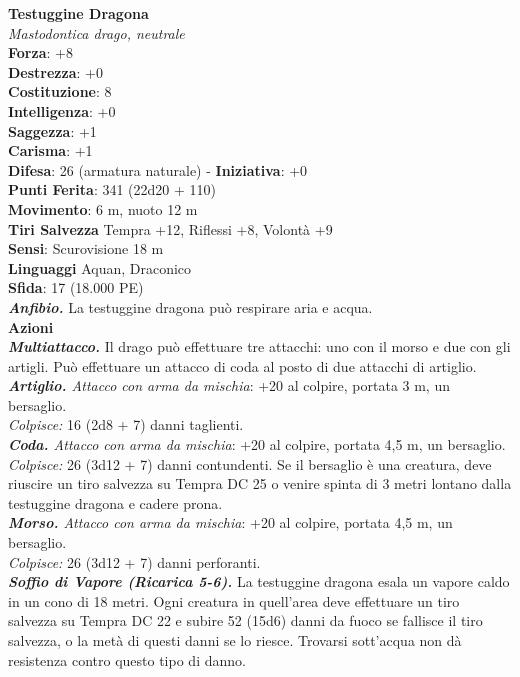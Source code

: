 \begin{multicols}{2}
\medskip\textbf{Testuggine Dragona}\\
\emph{Mastodontica drago, neutrale}\\
\textbf{Forza}: +8 \\
\textbf{Destrezza}: +0\\
\textbf{Costituzione}: 8\\
\textbf{Intelligenza}: +0\\
\textbf{Saggezza}: +1\\
\textbf{Carisma}: +1\\
\textbf{Difesa}: 26 (armatura naturale) - \textbf{Iniziativa}: +0\\
\textbf{Punti Ferita}: 341 (22d20 + 110)\\
\textbf{Movimento}: 6 m, nuoto 12 m\\
\textbf{Tiri Salvezza} Tempra +12, Riflessi +8, Volontà +9\\
\textbf{Sensi}: Scurovisione 18 m\\
\textbf{Linguaggi} Aquan, Draconico\\
\textbf{Sfida}: 17 (18.000 PE)\smallskip\\
\emph{\textbf{Anfibio.}} La testuggine dragona può respirare aria e acqua.\\
\smallskip\textbf{Azioni}\\
\emph{\textbf{Multiattacco.}} Il drago può effettuare tre attacchi: uno con il morso e due con gli artigli. Può effettuare un attacco di coda al posto di due attacchi di artiglio.\\
\emph{\textbf{Artiglio.} Attacco con arma da mischia}: +20 al colpire, portata 3 m, un bersaglio.\\
\emph{Colpisce:} 16 (2d8 + 7) danni taglienti. \\
\emph{\textbf{Coda.} Attacco con arma da mischia}: +20 al colpire, portata 4,5 m, un bersaglio.\\
\emph{Colpisce:} 26 (3d12 + 7) danni contundenti. Se il bersaglio è una creatura, deve riuscire un tiro salvezza su Tempra DC  25 o venire spinta di 3 metri lontano dalla testuggine dragona e cadere prona. \\
\emph{\textbf{Morso.} Attacco con arma da mischia}: +20 al colpire, portata 4,5 m, un bersaglio.\\
\emph{Colpisce:} 26 (3d12 + 7) danni perforanti. \\
\emph{\textbf{Soffio di Vapore (Ricarica 5-6).}} La testuggine dragona esala un vapore caldo in un cono di 18 metri. Ogni creatura in quell'area deve effettuare un tiro salvezza su Tempra DC  22 e subire 52 (15d6) danni da fuoco se fallisce il tiro salvezza, o la metà di questi danni se lo riesce. Trovarsi sott'acqua non dà resistenza contro questo tipo di danno.\\

\end{multicols}
